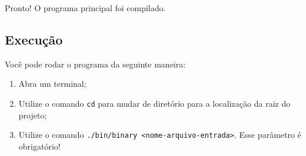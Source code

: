 \documentclass{article}
\def\code#1{\texttt{#1}}
\begin{document}
Pronto! O programa principal foi compilado. 

\subsection*{Execução}

Você pode rodar o programa da seguinte maneira:

\begin{enumerate}
    \item Abra um terminal;
    \item Utilize o comando \code{cd} para mudar de diretório para a localização da raiz do projeto;
    \item Utilize o comando \code{./bin/binary <nome-arquivo-entrada>}. Esse parâmetro é obrigatório!
\end{enumerate}
\end{document}
